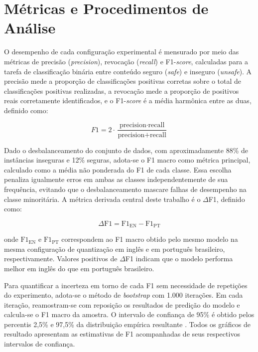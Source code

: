 \section{Métricas e Procedimentos de Análise}
\label{sec:metricas}

O desempenho de cada configuração experimental é mensurado por meio das métricas de precisão (\textit{precision}), revocação (\textit{recall}) e F1-\textit{score}, calculadas para a tarefa de classificação binária entre conteúdo seguro (\textit{safe}) e inseguro (\textit{unsafe}). A precisão mede a proporção de classificações positivas corretas sobre o total de classificações positivas realizadas, a revocação mede a proporção de positivos reais corretamente identificados, e o F1-\textit{score} é a média harmônica entre as duas, definido como:

\begin{equation}
	F1 = 2 \cdot \frac{\text{precision} \cdot \text{recall}}{\text{precision} + \text{recall}}
\end{equation}

Dado o desbalanceamento do conjunto de dados, com aproximadamente 88\% de instâncias inseguras e 12\% seguras, adota-se o F1 macro como métrica principal, calculado como a média não ponderada do F1 de cada classe. Essa escolha penaliza igualmente erros em ambas as classes independentemente de sua frequência, evitando que o desbalanceamento mascare falhas de desempenho na classe minoritária. A métrica derivada central deste trabalho é o $\Delta$F1, definido como:

\begin{equation}
	\Delta\text{F1} = \text{F1}_{\text{EN}} - \text{F1}_{\text{PT}}
\end{equation}

onde $\text{F1}_{\text{EN}}$ e $\text{F1}_{\text{PT}}$ correspondem ao F1 macro obtido pelo mesmo modelo na mesma configuração de quantização em inglês e em português brasileiro, respectivamente. Valores positivos de $\Delta$F1 indicam que o modelo performa melhor em inglês do que em português brasileiro.

Para quantificar a incerteza em torno de cada F1 sem necessidade de repetições do experimento, adota-se o método de \textit{bootstrap} com 1.000 iterações. Em cada iteração, reamostram-se com reposição os resultados de predição do modelo e calcula-se o F1 macro da amostra. O intervalo de confiança de 95\% é obtido pelos percentis 2,5\% e 97,5\% da distribuição empírica resultante \cite{efron1993bootstrap}. Todos os gráficos de resultado apresentam as estimativas de F1 acompanhadas de seus respectivos intervalos de confiança.

